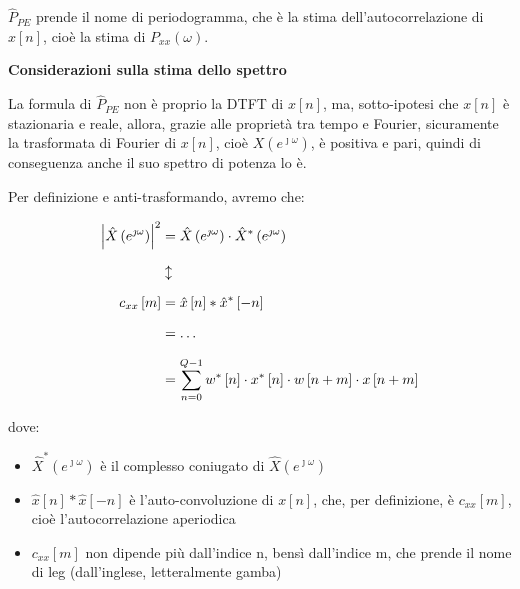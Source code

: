 $\hat{P}_{PE}$ prende il nome di periodogramma, che è la stima dell'autocorrelazione di $x \left[ n\right]$, cioè la stima di $P_{xx} \left(\omega\right)$. \newline 

\textbf{Considerazioni sulla stima dello spettro} \newline 

La formula di $ \hat{P}_{PE}$ non è proprio la DTFT di $x \left[ n\right]$, ma, 
sotto-ipotesi che $x \left[ n\right]$ è stazionaria e reale, allora, grazie alle proprietà tra tempo e Fourier, sicuramente la trasformata di Fourier di $x \left[ n\right]$, cioè $X \left(e^{\jmath \omega}\right)$, 
è positiva e pari, quindi di conseguenza anche il suo spettro di potenza lo è. \newline 

Per definizione e anti-trasformando, avremo che: 

{
    \Large 
    \begin{equation}
        \setlength{\jot}{10pt} %
        \begin{split}
            \abs{\hat{X} \left(e^{\jmath \omega}\right) }^{2} 
            &= 
            \hat{X} \left(e^{\jmath \omega}\right)
            \cdot 
            \hat{X}^{*} \left(e^{\jmath \omega}\right)
            \\
            &\updownarrow
            \\
            c_{xx} \left[ m\right]
            &=
            \hat{x} \left[ n\right]
            *
            \hat{x}^{*} \left[ -n\right] 
            \\
            &= 
            \dots
            \\
            &= 
            \sum_{n = 0}^{Q - 1} 
            w^{*} \left[ n\right] 
            \cdot 
            x^{*} \left[ n\right]
            \cdot 
            w \left[ n + m\right]
            \cdot 
            x \left[ n + m\right]
        \end{split}
    \end{equation}
}

dove: 

\begin{itemize}
    \item $\hat{X}^{*} \left(e^{\jmath \omega}\right)$ è il complesso coniugato di $\hat{X} \left(e^{\jmath \omega}\right)$ 
    \item $\hat{x} \left[ n\right] * \hat{x} \left[ -n\right]$ è l'auto-convoluzione di $x \left[ n\right]$, che, per definizione, è $c_{xx} \left[ m\right]$, cioè l'autocorrelazione aperiodica 
    \item $c_{xx} \left[ m\right]$ non dipende più dall'indice n, bensì dall'indice m, che prende il nome di leg (dall'inglese, letteralmente gamba) 
\end{itemize}

